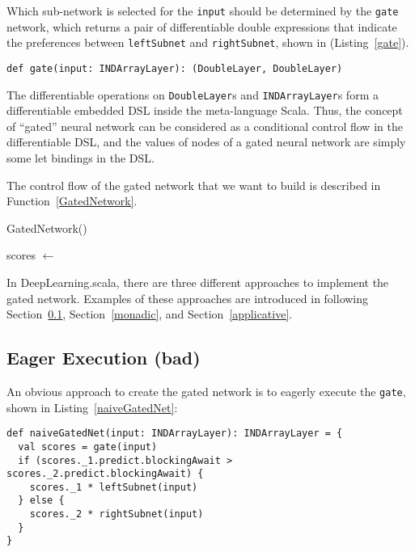 Which sub-network is selected for the \lstinline{input} should be determined by the \lstinline{gate} network, which returns a pair of differentiable double expressions that indicate the preferences between \lstinline{leftSubnet} and \lstinline{rightSubnet}, shown in (Listing~\ref{gate}).

\begin{lstlisting}[float={h t b p},caption={Predefined gate network},label={gate}]
def gate(input: INDArrayLayer): (DoubleLayer, DoubleLayer)
\end{lstlisting}

The differentiable operations on \lstinline{DoubleLayer}s  and \lstinline{INDArrayLayer}s form a differentiable embedded DSL inside the meta-language Scala. Thus, the concept of ``gated'' neural network can be considered as a conditional control flow in the differentiable DSL, and the values of nodes of a gated neural network are simply some let bindings in the DSL.

The control flow of the gated network that we want to build is described in Function~\ref{GatedNetwork}.

\begin{function}[H]
  \caption{GatedNetwork()\label{GatedNetwork}}
  scores $\leftarrow$ \;
\end{function}

In DeepLearning.scala, there are three different approaches to implement the gated network. Examples of these approaches are introduced in following Section~\ref{eager}, Section~\ref{monadic}, and Section~\ref{applicative}.

\subsection{Eager Execution (bad)}
\label{eager}

An obvious approach to create the gated network is to eagerly execute the \lstinline{gate}, shown in Listing~\ref{naiveGatedNet}:

\begin{lstlisting}[float={h t b p},caption={The eager execution implementation of gated network}, label={naiveGatedNet}]
def naiveGatedNet(input: INDArrayLayer): INDArrayLayer = {
  val scores = gate(input)
  if (scores._1.predict.blockingAwait > scores._2.predict.blockingAwait) {
    scores._1 * leftSubnet(input)
  } else {
    scores._2 * rightSubnet(input)
  }
}
\end{lstlisting}

